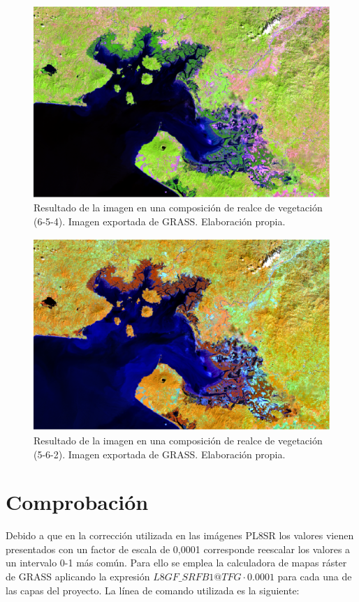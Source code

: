 \begin{figure}
	\centering
	\includegraphics[width=0.8\linewidth]{./Imagenes/GF654.eps}
	\caption[Composición 654]{Resultado de la imagen en una composición de realce de vegetación (6-5-4). Imagen exportada de GRASS. Elaboración propia.}
	\label{fig:gf654}
\end{figure}

\begin{figure}
	\centering
	\includegraphics[width=0.8\linewidth]{./Imagenes/GF562.eps}
	\caption[Composición 562]{Resultado de la imagen en una composición de realce de vegetación (5-6-2). Imagen exportada de GRASS. Elaboración propia.}
	\label{fig:gf562}
\end{figure}

\section{Comprobación}
Debido a que en la corrección utilizada en las imágenes \ac{PL8SR} los valores vienen presentados con un factor de escala de 0,0001 \citep{USGS2015} corresponde reescalar los valores a un intervalo 0-1 más común. Para ello se emplea la calculadora de mapas ráster de GRASS aplicando la expresión $L8GF\_SRFB1@TFG \cdot 0.0001$ para cada una de las capas del proyecto. La línea de comando utilizada es la siguiente:


